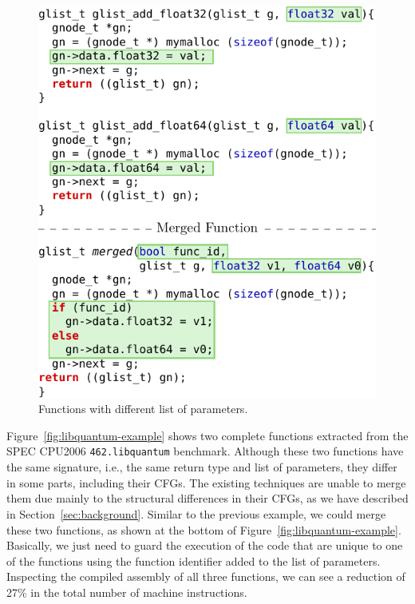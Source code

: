 \begin{figure}[t!]
  \centering
  \includegraphics[width=.95\linewidth]{figs/sphinx-example.pdf}
  \caption{Functions with different list of parameters.}
  \label{fig:sphinx-example}
\end{figure}


Figure~\ref{fig:libquantum-example} shows two complete functions extracted from the SPEC CPU2006 \texttt{462.libquantum} benchmark.
Although these two functions have the same signature, i.e., the same return type and list of parameters, they differ in some parts,
including their CFGs. The existing techniques are unable to merge them due mainly to the structural differences in their CFGs, as we have
described in Section~\ref{sec:background}.
Similar to the previous example, we could merge these two functions, as shown at the bottom of Figure~\ref{fig:libquantum-example}. Basically, we just need to guard the execution of the code that are unique to
one of the functions using the function identifier added to the list of parameters.
Inspecting the compiled assembly of all three functions, we can see a reduction of 27\% in the total number of machine instructions.

